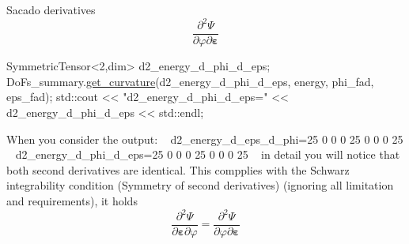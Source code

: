  Sacado derivatives \[ \frac{\partial^2 \Psi}{\partial \varphi \partial \boldsymbol{\varepsilon}} \] 
\begin{DoxyCode}
SymmetricTensor<2,dim> d2\_energy\_d\_phi\_d\_eps;
DoFs\_summary.\hyperlink{classSacado__Wrapper_1_1DoFs__summary_adf29bfda10814ecee9572a4751d34db0}{get\_curvature}(d2\_energy\_d\_phi\_d\_eps, energy, phi\_fad, eps\_fad);
std::cout << \textcolor{stringliteral}{"d2\_energy\_d\_phi\_d\_eps="} << d2\_energy\_d\_phi\_d\_eps << std::endl;
\end{DoxyCode}
 When you consider the output\+: ~\newline
d2\+\_\+energy\+\_\+d\+\_\+eps\+\_\+d\+\_\+phi=25 0 0 0 25 0 0 0 25 ~\newline
d2\+\_\+energy\+\_\+d\+\_\+phi\+\_\+d\+\_\+eps=25 0 0 0 25 0 0 0 25 ~\newline
in detail you will notice that both second derivatives are identical. This compplies with the Schwarz integrability condition (Symmetry of second derivatives) (ignoring all limitation and requirements), it holds \[ \frac{\partial^2 \Psi}{\partial \boldsymbol{\varepsilon} \partial \varphi} = \frac{\partial^2 \Psi}{\partial \varphi \partial \boldsymbol{\varepsilon}} \]


